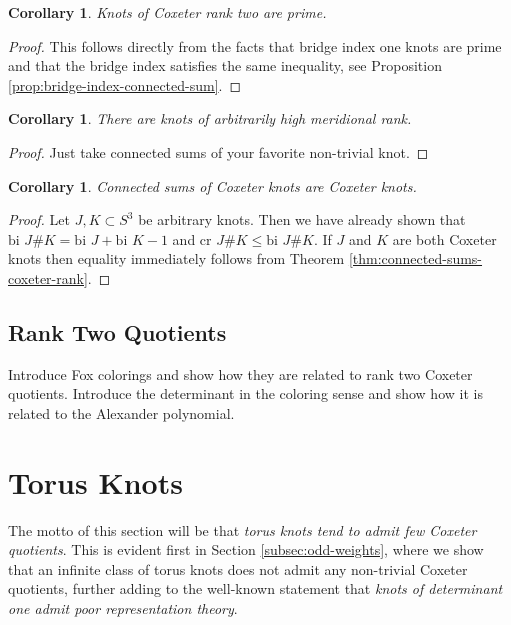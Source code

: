 \documentclass{article}
\newtheorem{corollary}[theorem]{Corollary}
\theoremstyle{definition}
\begin{document}
\begin{corollary}
Knots of Coxeter rank two are prime.
\end{corollary}

\begin{proof}
This follows directly from the facts that bridge index one knots are prime and that the bridge index satisfies the same inequality, see Proposition \ref{prop:bridge-index-connected-sum}.
\end{proof}

\begin{corollary}
There are knots of arbitrarily high meridional rank.
\end{corollary}

\begin{proof}
Just take connected sums of your favorite non-trivial knot.
\end{proof}

\begin{corollary}
Connected sums of Coxeter knots are Coxeter knots.
\end{corollary}

\begin{proof}
Let $J, K \subset S^3$ be arbitrary knots. Then we have already shown that $\text{bi } J\#K = \text{bi } J + \text{bi } K - 1$ and $\text{cr } J\#K \leq \text{bi } J\#K$. If $J$ and $K$ are both Coxeter knots then equality immediately follows from Theorem \ref{thm:connected-sums-coxeter-rank}.
\end{proof}

\subsection{Rank Two Quotients}\label{subsec:rank-two}
Introduce Fox colorings and show how they are related to rank two Coxeter quotients. Introduce the determinant in the coloring sense and show how it is related to the Alexander polynomial.

\newpage

\section{Torus Knots}
The motto of this section will be that \textit{torus knots tend to admit few Coxeter quotients}. This is evident first in Section \ref{subsec:odd-weights}, where we show that an infinite class of torus knots does not admit any non-trivial Coxeter quotients, further adding to the well-known statement that \textit{knots of determinant one admit poor representation theory}.
\end{document}
